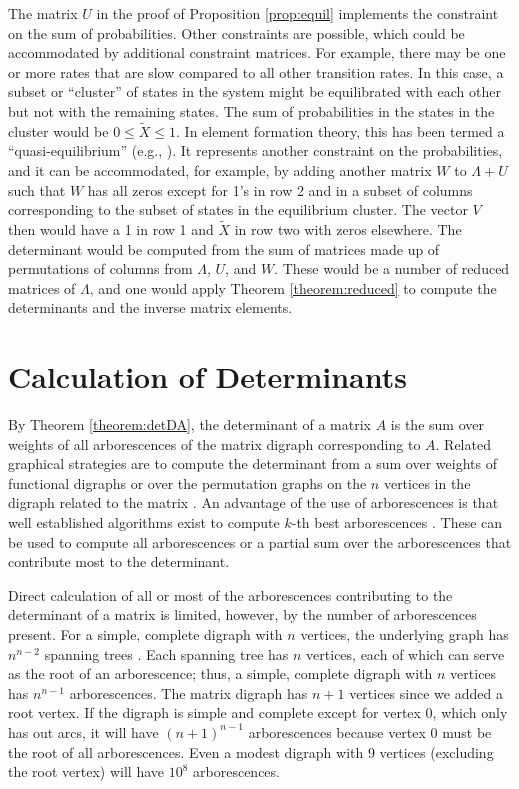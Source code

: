 \documentclass{article}
\begin{document}
The matrix $U$ in the proof of Proposition \ref{prop:equil} implements the constraint on the sum of probabilities.  Other constraints are possible, which could be accommodated by additional constraint matrices.   For example, there may be one or more rates that are slow compared to all other transition rates.  In this case, a subset or ``cluster'' of states in the system might be equilibrated with each other but not with the remaining states.  The sum of probabilities in the states in the cluster would be $0 \leq \tilde{X} \leq 1$.  In element formation theory, this has been termed a ``quasi-equilibrium'' (e.g., \cite{1998ApJ...498..808M}).  It represents another constraint on the probabilities, and it can be accommodated, for example, by adding another matrix $W$ to $\Lambda + U$ such that $W$ has all zeros except for 1's in row 2 and in a subset of columns corresponding to the subset of states in the equilibrium cluster.  The vector $V$ then would have a 1 in row 1 and $\tilde{X}$ in row two with zeros elsewhere.  The determinant would be computed from the sum of matrices made up of permutations of columns from $\Lambda$, $U$, and $W$.  These would be a number of reduced matrices of $\Lambda$, and one would apply Theorem \ref{theorem:reduced} to compute the determinants and the inverse matrix elements.

\section{Calculation of Determinants}

By Theorem \ref{theorem:detDA}, the determinant of a matrix $A$ is the sum over weights of all arborescences of the matrix digraph corresponding to $A$.  Related graphical strategies are to compute the determinant from a sum over weights of functional digraphs \cite{MOON1994163} or over the permutation graphs on the $n$ vertices in the digraph related to the matrix \cite{zeilberger1985combinatorial}.  An advantage of the use of arborescences is that well established algorithms exist to compute $k$-th best arborescences \cite{Camerini1980TheKB, sorensen2005}.  These can be used to compute all arborescences or a partial sum over the arborescences that contribute most to the determinant.

Direct calculation of all or most of the arborescences contributing to the determinant of a matrix is limited, however, by the number of arborescences present.  For a simple, complete digraph with $n$
vertices, the underlying graph has $n^{n-2}$ spanning trees \cite{Cayley1889}.  Each spanning tree has $n$ vertices, each of which can serve as the root of an arborescence; thus, a simple, complete digraph with $n$ vertices has $n^{n-1}$ arborescences.  The matrix digraph has $n+1$ vertices since we added a root vertex.  If the digraph is simple and complete except for vertex 0, which only has out arcs, it will have $(n+1)^{n-1}$ arborescences because vertex 0 must be the root of all arborescences.  Even a modest digraph with 9 vertices (excluding the root vertex) will have $10^8$ arborescences.
\end{document}
